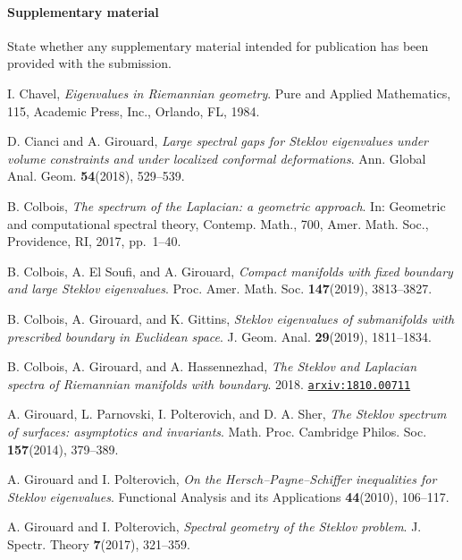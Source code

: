 \documentclass{CUP-JNL-FMP}%
\theoremstyle{definition}
\numberwithin{equation}{section}
\begin{document}
\begin{Backmatter}
\paragraph{Supplementary material}
State whether any supplementary material intended for publication has been provided with the submission.


\begin{thebibliography}{99}

I. Chavel, \emph{Eigenvalues in {R}iemannian geometry}. Pure and Applied Mathematics, 115, Academic Press, Inc., Orlando, FL, 1984.

D. Cianci  and A. Girouard, \emph{Large spectral gaps for {S}teklov eigenvalues under volume 	constraints and under localized conformal deformations}. Ann. Global Anal. Geom. \textbf{54}(2018),  529--539. 
	

B. Colbois, \emph{The spectrum of the {L}aplacian: a geometric approach}. In: Geometric and computational spectral theory, Contemp. Math., 700, Amer. Math. Soc., Providence, RI, 2017, pp.~1--40. 

B. Colbois, A.  El Soufi,  and A. Girouard, \emph{Compact manifolds with fixed boundary and large {S}teklov eigenvalues}. Proc. Amer. Math. Soc. \textbf{147}(2019),  3813--3827. 


B. Colbois, A. Girouard,   and K. Gittins, \emph{Steklov eigenvalues of submanifolds with prescribed boundary in {E}uclidean space}. J. Geom. Anal. \textbf{29}(2019),  1811--1834. 

B. Colbois, A. Girouard,   and A. Hassennezhad, \emph{The {S}teklov and {L}aplacian spectra of {R}iemannian manifolds with boundary}. 2018. \href{http://arxiv.org/abs/1810.00711}{\nolinkurl{arxiv:1810.00711}}


A. Girouard, L. Parnovski, I. Polterovich,	 and D. A. Sher, \emph{The {S}teklov spectrum of surfaces: asymptotics and invariants}. Math. Proc. Cambridge Philos. Soc. \textbf{157}(2014), 379--389. 


A. Girouard  and I. Polterovich, \emph{On the {H}ersch--{P}ayne--{S}chiffer inequalities for {S}teklov eigenvalues}. Functional Analysis and its Applications \textbf{44}(2010), 106--117.


A. Girouard  and I. Polterovich, \emph{Spectral geometry of the {S}teklov problem}. J. Spectr. Theory
\textbf{7}(2017), 321--359. 


\end{thebibliography}
\end{Backmatter}
\end{document}
